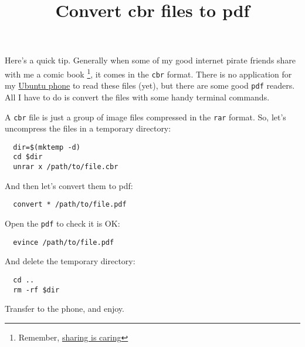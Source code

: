 \documentclass[12pt]{article}
\title{Convert cbr files to pdf}
\begin{document}
Here's a quick tip. Generally when some of my good internet pirate friends
share with me a comic book
\footnote{Remember, \href{http://kswp.org/wp/wp-content/uploads/2013/02/sharing-is-caring.jpg}
  {sharing is caring}},
it comes in the \verb$cbr$ format. There is no application for my \href{https://insights.ubuntu.com/2015/06/24/meizu-launches-the-mx4-ubuntu-edition-in-europe/}
{Ubuntu phone} to read these files (yet), but there are some good \verb$pdf$
readers. All I have to do is convert the files with some handy terminal commands.

A \verb$cbr$ file is just a group of image files compressed in the \verb$rar$
format. So, let's uncompress the files in a temporary directory:

\begin{verbatim}
  dir=$(mktemp -d)
  cd $dir
  unrar x /path/to/file.cbr
\end{verbatim}

And then let's convert them to pdf:

\begin{verbatim}
  convert * /path/to/file.pdf
\end{verbatim}

Open the \verb$pdf$ to check it is OK:

\begin{verbatim}
  evince /path/to/file.pdf
\end{verbatim}

And delete the temporary directory:

\begin{verbatim}
  cd ..
  rm -rf $dir
\end{verbatim}

Transfer to the phone, and enjoy.
\end{document}
